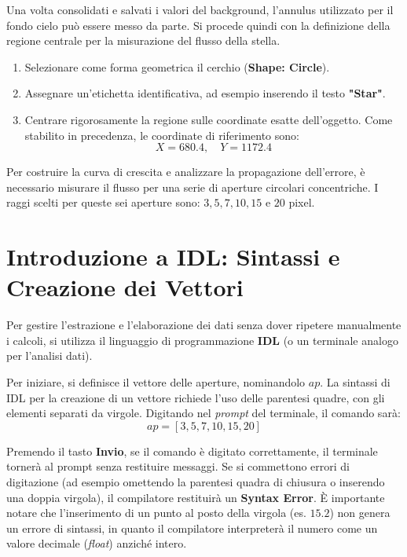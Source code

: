 Una volta consolidati e salvati i valori del background, l'annulus utilizzato per il fondo cielo può essere messo da parte. Si procede quindi con la definizione della regione centrale per la misurazione del flusso della stella.

\begin{enumerate}
\item Selezionare come forma geometrica il cerchio (\textbf{Shape: Circle}).
\item Assegnare un'etichetta identificativa, ad esempio inserendo il testo \textbf{"Star"}.
\item Centrare rigorosamente la regione sulle coordinate esatte dell'oggetto. Come stabilito in precedenza, le coordinate di riferimento sono:
\begin{equation}
X = 680.4, \quad Y = 1172.4
\end{equation}
\end{enumerate}

Per costruire la curva di crescita e analizzare la propagazione dell'errore, è necessario misurare il flusso per una serie di aperture circolari concentriche. I raggi scelti per queste sei aperture sono: $3, 5, 7, 10, 15$ e $20$ pixel.

\section{Introduzione a IDL: Sintassi e Creazione dei Vettori}

Per gestire l'estrazione e l'elaborazione dei dati senza dover ripetere manualmente i calcoli, si utilizza il linguaggio di programmazione \textbf{IDL} (o un terminale analogo per l'analisi dati).

Per iniziare, si definisce il vettore delle aperture, nominandolo $ap$. La sintassi di IDL per la creazione di un vettore richiede l'uso delle parentesi quadre, con gli elementi separati da virgole. Digitando nel \textit{prompt} del terminale, il comando sarà:
\begin{equation}
ap = [3, 5, 7, 10, 15, 20]
\end{equation}

Premendo il tasto \textbf{Invio}, se il comando è digitato correttamente, il terminale tornerà al prompt senza restituire messaggi. Se si commettono errori di digitazione (ad esempio omettendo la parentesi quadra di chiusura o inserendo una doppia virgola), il compilatore restituirà un \textbf{Syntax Error}.
È importante notare che l'inserimento di un punto al posto della virgola (es. $15.2$) non genera un errore di sintassi, in quanto il compilatore interpreterà il numero come un valore decimale (\textit{float}) anziché intero.


